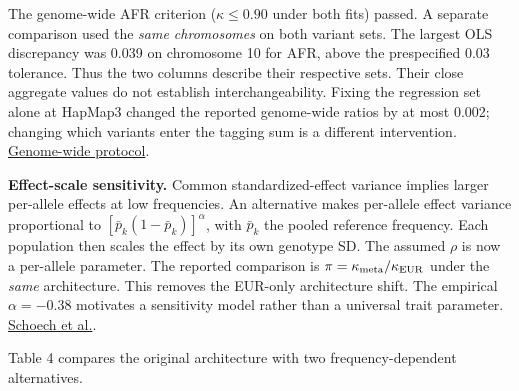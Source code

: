 \documentclass[11pt,a4paper]{article}
\begin{document}
The genome-wide AFR criterion (\(\kappa\leq0.90\) under both fits) passed. A separate comparison used the \emph{same chromosomes} on both variant sets. The largest OLS discrepancy was 0.039 on chromosome 10 for AFR, above the prespecified 0.03 tolerance. Thus the two columns describe their respective sets. Their close aggregate values do not establish interchangeability. Fixing the regression set alone at HapMap3 changed the reported genome-wide ratios by at most 0.002; changing which variants enter the tagging sum is a different intervention. \href{../experiments/multiancestry_genome_kappa.py}{Genome-wide protocol}.

\textbf{Effect-scale sensitivity.} Common standardized-effect variance implies larger per-allele effects at low frequencies. An alternative makes per-allele effect variance proportional to \([\bar p_k(1-\bar p_k)]^\alpha\), with \(\bar p_k\) the pooled reference frequency. Each population then scales the effect by its own genotype SD. The assumed \(\rho\) is now a per-allele parameter. The reported comparison is \(\pi=\kappa_{\rm meta}/\kappa_{\rm EUR}\) under the \emph{same} architecture. This removes the EUR-only architecture shift. The empirical \(\alpha=-0.38\) motivates a sensitivity model rather than a universal trait parameter. \href{https://doi.org/10.1038/s41467-019-08424-6}{Schoech et al.}.

Table 4 compares the original architecture with two frequency-dependent alternatives.
\end{document}
